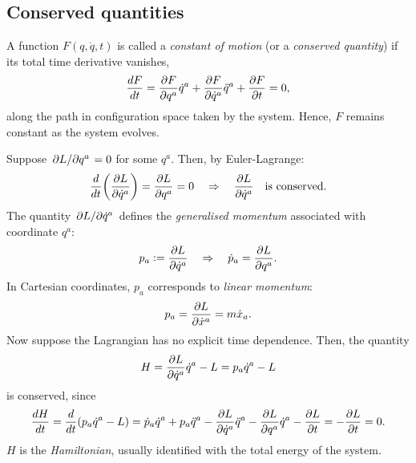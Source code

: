 \documentclass{article}
\begin{document}
\subsection{Conserved quantities}
A function $F(q,\dot{q},t)$ is called a \textit{constant of motion} (or a \textit{conserved quantity}) if its total time derivative vanishes,
\begin{equation}
	\dv{F}{t} = \pdv{F}{q^{a}} \dot{q}^{a} + \pdv{F}{\dot{q}^{a}} \ddot{q}^{a} + \pdv{F}{t} = 0,
\end{equation}
along the path in configuration space taken by the system. Hence, $ F $ remains constant as the system evolves. 
\par
Suppose $ \pdv*{L}{q^{a}} = 0 $ for some $ q^{a} $. Then, by Euler-Lagrange:
\begin{equation}
	\dv{}{t}\qty(\pdv{L}{\dot{q}^{a}}) = \pdv{L}{q^{a}} = 0 \quad \Rightarrow \quad \pdv{L}{\dot{q}^{a}} \quad \text{is conserved.}
\end{equation}
The quantity $ \pdv*{L}{\dot{q}^{a}} $ defines the \textit{generalised momentum} associated with coordinate $ q^{a} $:
\begin{equation}
	p_{a} \vcentcolon= \pdv{L}{\dot{q}^{a}} \quad \Rightarrow \quad \dot{p}_{a} = \pdv{L}{q^{a}}.
\end{equation}
In Cartesian coordinates, $ p_{a} $ corresponds to \textit{linear momentum}:
\[
	p_{a} = \pdv{L}{\dot{x}^{a}} = m \dot{x}_{a}.
\]
Now suppose the Lagrangian has no explicit time dependence. Then, the quantity
\begin{equation}
	H = \pdv{L}{\dot{q}^{a}} \dot{q}^{a} - L = p_{a} \dot{q}^{a} - L
\end{equation}
is conserved, since
\begin{align}
	\begin{split}
		\dv{H}{t} = \dv{t} \qty(p_{a} \dot{q}^{a} - L) = \dot{p}_{a} \dot{q}^{a} + p_{a} \ddot{q}^{a} - \pdv{L}{\dot{q}^{a}} \ddot{q}^{a} - \pdv{L}{q^{a}} \dot{q}^{a} - \pdv{L}{t} = -\pdv{L}{t} = 0.
	\end{split}
\end{align}
$ H $ is the \textit{Hamiltonian}, usually identified with the total energy of the system.
\end{document}
